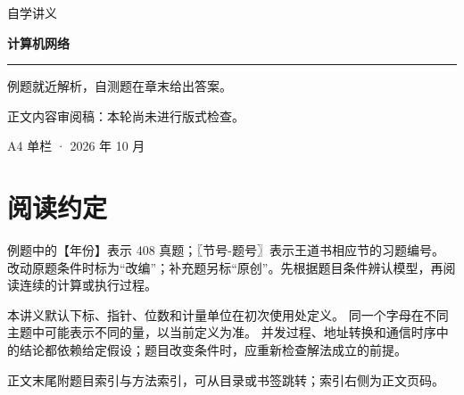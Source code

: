 
\newcommand{\BookTitle}{计算机网络}

\begin{titlepage}
\thispagestyle{empty}
\vspace*{25mm}
{\sffamily\color{accent}\fontsize{16}{24} 自学讲义}\par
\vspace{15mm}
{\sffamily\bfseries\color{ink}\fontsize{32}{45}\selectfont 计算机网络}\par
\vspace{15mm}
\noindent\rule{\textwidth}{0.5pt}\par
\vspace{5mm}
\noindent 例题就近解析，自测题在章末给出答案。\par
\vspace{5mm}\noindent 正文内容审阅稿：本轮尚未进行版式检查。\par
\vfill
\noindent A4 单栏 · 2026 年 10 月\par
\end{titlepage}
\tableofcontents
\clearpage
{}\chapter*{阅读约定}
例题中的【年份】表示 408 真题；〖节号-题号〗表示王道书相应节的习题编号。
改动原题条件时标为“改编”；补充题另标“原创”。先根据题目条件辨认模型，再阅读连续的计算或执行过程。

本讲义默认下标、指针、位数和计量单位在初次使用处定义。
同一个字母在不同主题中可能表示不同的量，以当前定义为准。
并发过程、地址转换和通信时序中的结论都依赖给定假设；题目改变条件时，应重新检查解法成立的前提。

正文末尾附题目索引与方法索引，可从目录或书签跳转；索引右侧为正文页码。
\clearpage
{}
\setcounter{chapter}{0}



